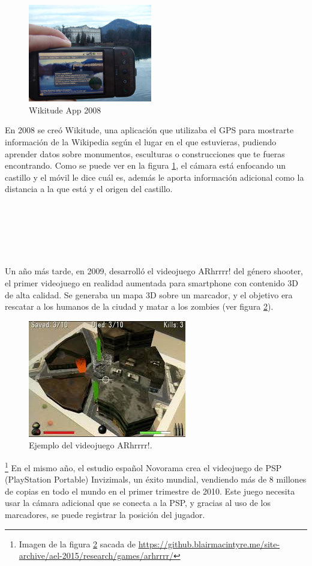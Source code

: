 \begin{figure}
    \centering
    \includegraphics[width=0.48\textwidth]{Images/Wikitude_Example.jpeg}
    \caption{Wikitude App 2008}
    \label{fig:wikitude2008}
\end{figure}

En 2008 se creó Wikitude, una aplicación que utilizaba el GPS para mostrarte información de la Wikipedia según el lugar en el que estuvieras, pudiendo aprender datos sobre monumentos, esculturas o construcciones que te fueras encontrando. Como se puede ver en la figura \ref{fig:wikitude2008}, el cámara está enfocando un castillo y el móvil le dice cuál es, además le aporta información adicional como la distancia a la que está y el origen del castillo. \\
\\
\\
\\
\\
\\
\\

Un año más tarde, en 2009, desarrolló el videojuego ARhrrrr! del género shooter, el primer videojuego en realidad aumentada para smartphone con contenido 3D de alta calidad. Se generaba un mapa 3D sobre un marcador, y el objetivo era rescatar a los humanos de la ciudad y matar a los zombies (ver figura \ref{fig:arhrrrr})\cite{ARToolkit}.

\begin{figure}[H]
    \centering
        \includegraphics[width=0.5\linewidth]{Images/Arrrr.jpeg}
        \caption{Ejemplo del videojuego ARhrrrr!.}
        \label{fig:arhrrrr}
  \end{figure}
{\let\thefootnote\relax\footnote{{Imagen de la figura \ref{fig:arhrrrr} sacada de \url{https://github.blairmacintyre.me/site-archive/ael-2015/research/games/arhrrrr/}}}}
En el mismo año, el estudio español Novorama crea el videojuego de PSP (PlayStation Portable) Invizimals, un éxito mundial, vendiendo más de 8 millones de copias en todo el mundo en el primer trimestre de 2010. Este juego necesita usar la cámara adicional que se conecta a la PSP, y gracias al uso de los marcadores, se puede registrar la posición del jugador.


